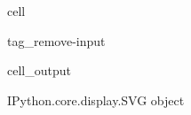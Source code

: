 \documentclass[letterpaper,10pt,english]{jupyterBook}
\begin{document}
\begin{sphinxuseclass}{cell}
\begin{sphinxuseclass}{tag_remove-input}\begin{sphinxVerbatimOutput}

\begin{sphinxuseclass}{cell_output}
\begin{sphinxVerbatim}[commandchars=\\\{\}]
\PYGZlt{}IPython.core.display.SVG object\PYGZgt{}
\end{sphinxVerbatim}

\end{sphinxuseclass}\end{sphinxVerbatimOutput}

\end{sphinxuseclass}
\end{sphinxuseclass}
\end{document}
